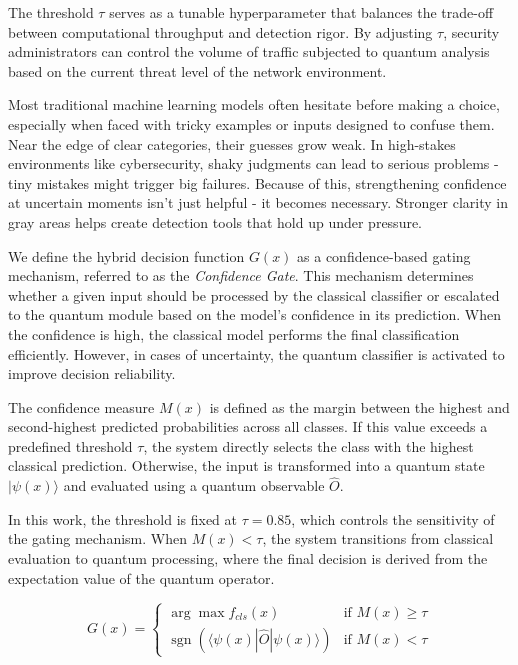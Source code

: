 \documentclass[journal,onecolumn]{IEEEtran}
\begin{document}
The threshold $\tau$ serves as a tunable hyperparameter that balances the trade-off between computational throughput and detection rigor. By adjusting $\tau$, security administrators can control the volume of traffic subjected to quantum analysis based on the current threat level of the network environment.

Most traditional machine learning models often hesitate before making a choice, especially when faced with tricky examples or inputs designed to confuse them. Near the edge of clear categories, their guesses grow weak. In high-stakes environments like cybersecurity, shaky judgments can lead to serious problems - tiny mistakes might trigger big failures. Because of this, strengthening confidence at uncertain moments isn't just helpful - it becomes necessary. Stronger clarity in gray areas helps create detection tools that hold up under pressure.

We define the hybrid decision function $G(x)$ as a confidence-based gating mechanism, referred to as the \textit{Confidence Gate}. This mechanism determines whether a given input should be processed by the classical classifier or escalated to the quantum module based on the model's confidence in its prediction. When the confidence is high, the classical model performs the final classification efficiently. However, in cases of uncertainty, the quantum classifier is activated to improve decision reliability.

The confidence measure $M(x)$ is defined as the margin between the highest and second-highest predicted probabilities across all classes. If this value exceeds a predefined threshold $\tau$, the system directly selects the class with the highest classical prediction. Otherwise, the input is transformed into a quantum state $|\psi(x)\rangle$ and evaluated using a quantum observable $\hat{O}$.

In this work, the threshold is fixed at $\tau = 0.85$, which controls the sensitivity of the gating mechanism. When $M(x) < \tau$, the system transitions from classical evaluation to quantum processing, where the final decision is derived from the expectation value of the quantum operator.

\begin{equation}
G(x) =
\begin{cases}
\arg\max f_{cls}(x) & \text{if } M(x) \geq \tau \\
\operatorname{sgn}\left(\langle \psi(x) | \hat{O} | \psi(x) \rangle\right) & \text{if } M(x) < \tau
\end{cases}
\end{equation}
\end{document}
